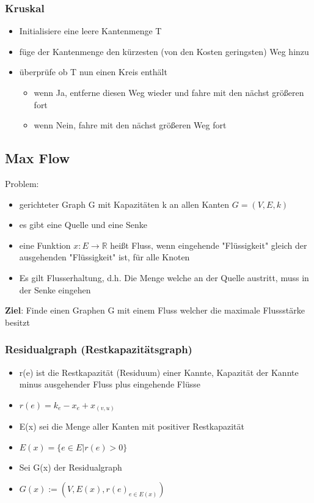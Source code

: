 \documentclass[12pt,a4paper, hyperref]{article}
\begin{document}
\subsubsection{Kruskal}
\begin{itemize}
\item Initialisiere eine leere Kantenmenge T
\item füge der Kantenmenge den kürzesten (von den Kosten geringsten) Weg hinzu
\item überprüfe ob T nun einen Kreis enthält
\begin{itemize}
\item wenn Ja, entferne diesen Weg wieder und fahre mit den nächst größeren fort
\item wenn Nein, fahre mit den nächst größeren Weg fort
\end{itemize}
\end{itemize}

\subsection{Max Flow}
Problem:
\begin{itemize}
\item gerichteter Graph G mit Kapazitäten k an allen Kanten $G = (V, E, k)$
\item es gibt eine Quelle und eine Senke
\item eine Funktion $x: E \rightarrow \mathbb{R}$ heißt Fluss, wenn eingehende "Flüssigkeit" gleich der ausgehenden "Flüssigkeit" ist, für alle Knoten
\item Es gilt Flusserhaltung, d.h. Die Menge welche an der Quelle austritt, muss in der Senke eingehen
\end{itemize}
\textbf{Ziel}:
Finde einen Graphen G mit einem Fluss welcher die maximale Flussstärke besitzt

\subsubsection{Residualgraph (Restkapazitätsgraph)}
\begin{itemize}
\item r(e) ist die Restkapazität (Residuum) einer Kannte, Kapazität der Kannte minus ausgehender Fluss plus eingehende Flüsse
\item $r(e) = k_e - x_e + x_{(v, u)}$
\item E(x) sei die Menge aller Kanten mit positiver Restkapazität
\item $E(x) = \{e \in E | r(e) >0 \}$
\item Sei G(x) der Residualgraph
\item $G(x) := (V, E(x), r(e)_{e\in E(x)})$
\end{itemize}
\end{document}
